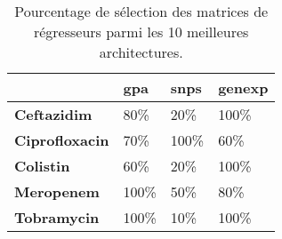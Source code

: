 \begin{table}[H]
\centering
\caption{Pourcentage de sélection des matrices de régresseurs parmi les 10 meilleures architectures.}
\label{tab:res_x}
\begin{tabular}{llll}
\toprule
{} &   gpa &  snps & genexp \\
\midrule
\textbf{Ceftazidim   } &   80\% &   20\% &   100\% \\
\textbf{Ciprofloxacin} &   70\% &  100\% &    60\% \\
\textbf{Colistin     } &   60\% &   20\% &   100\% \\
\textbf{Meropenem    } &  100\% &   50\% &    80\% \\
\textbf{Tobramycin   } &  100\% &   10\% &   100\% \\
\bottomrule
\end{tabular}
\end{table}
